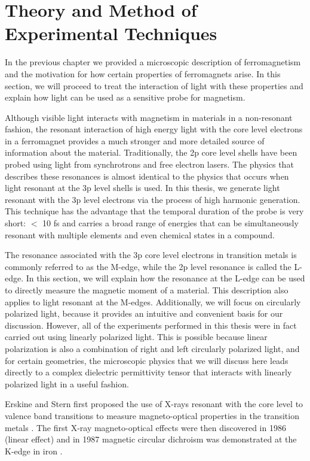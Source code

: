 \chapter{Theory and Method of Experimental Techniques}

In the previous chapter we provided a microscopic description of ferromagnetism and the motivation for how certain properties of ferromagnets arise. In this section, we will proceed to treat the interaction of light with these properties and explain how light can be used as a sensitive probe for magnetism. 

Although visible light interacts with magnetism in materials in a non-resonant fashion, the resonant interaction of high energy light with the core level electrons in a ferromagnet provides a much stronger and more detailed source of information about the material. Traditionally, the 2p core level shells have been probed using light from synchrotrons and free electron lasers. The physics that describes these resonances is almost identical to the physics that occurs when light resonant at the 3p level shells is used. In this thesis, we generate light resonant with the 3p level electrons via the process of high harmonic generation. This technique has the advantage that the temporal duration of the probe is very short: $<$ 10 fs and carries a broad range of energies that can be simultaneously resonant with multiple elements and even chemical states in a compound. 

The resonance associated with the 3p core level electrons in transition metals is commonly referred to as the M-edge, while the 2p level resonance is called the L-edge. In this section, we will explain how the resonance at the L-edge can be used to directly measure the magnetic moment of a material. This description also applies to light resonant at the M-edges. Additionally, we will focus on circularly polarized light, because it provides an intuitive and convenient basis for our discussion. However, all of the experiments performed in this thesis were in fact carried out using linearly polarized light. This is possible because linear polarization is also a combination of right and left circularly polarized light, and for certain geometries, the microscopic physics that we will discuss here leads directly to a complex dielectric permittivity tensor that interacts with linearly polarized light in a useful fashion.

Erskine and Stern first proposed the use of X-rays resonant with the core level to valence band transitions to measure magneto-optical properties in the transition metals \cite{Erskine1975}. The first X-ray magneto-optical effects were then discovered in 1986 (linear effect) \cite{VanderLaan1986} and in 1987 magnetic circular dichroism was demonstrated at the K-edge in iron \cite{Schuetz1987}.

